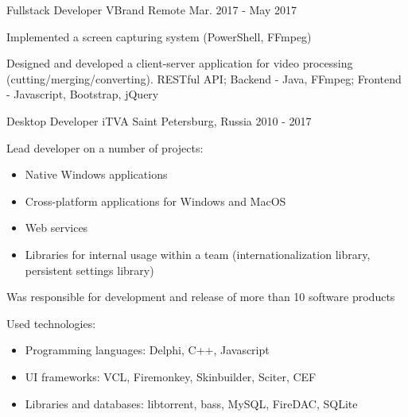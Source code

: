 \begin{cventries}
  \cventry
    {Fullstack Developer} %
    {VBrand} %
    {Remote} %
    {Mar. 2017 - May 2017} %
    {
      \begin{cvitems} %
        \item Implemented a screen capturing system (PowerShell, FFmpeg)
		\item Designed and developed a client-server application for video processing (cutting/merging/converting). RESTful API; Backend - Java, FFmpeg; Frontend - Javascript, Bootstrap, jQuery
      \end{cvitems}
    }

  \cventry
  {Desktop Developer} %
  {iTVA} %
  {Saint Petersburg, Russia} %
  {2010 - 2017} %
  {
    \begin{cvitems} %
      \item Lead developer on a number of projects:
      \begin{itemize}[label={•},leftmargin=10pt] %
        \item Native Windows applications
        \item Cross-platform applications for Windows and MacOS
        \item Web services
        \item Libraries for internal usage within a team (internationalization library, persistent settings library)
      \end{itemize}
      \item Was responsible for development and release of more than 10 software products
      \item Used technologies:
      \begin{itemize}[label={•},leftmargin=10pt] %
        \item Programming languages: Delphi, C++, Javascript
        \item UI frameworks: VCL, Firemonkey, Skinbuilder, Sciter, CEF
        \item Libraries and databases: libtorrent, bass, MySQL, FireDAC, SQLite
      \end{itemize}
    \end{cvitems}
  }

\end{cventries}
